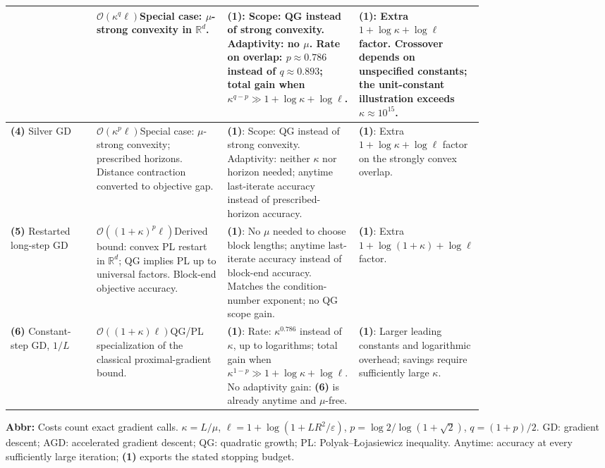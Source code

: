 \begin{table}[tp]
\begin{threeparttable}
\begin{tabularx}{\linewidth}{@{}>{\raggedright\arraybackslash}p{0.20\linewidth}>{\raggedright\arraybackslash}p{0.30\linewidth}>{\raggedright\arraybackslash}p{0.28\linewidth}>{\raggedright\arraybackslash}X@{}}
& $\mathcal{O}(\kappa^q\ell)$\newline Special case: $\mu$-strong convexity in $\mathbb R^d$.
& \textbf{(1)}: Scope: QG instead of strong convexity. Adaptivity: no $\mu$. Rate on overlap: $p\approx0.786$ instead of $q\approx0.893$; total gain when $\kappa^{q-p}\gg1+\log\kappa+\log\ell$.
& \textbf{(1)}: Extra $1+\log\kappa+\log\ell$ factor. Crossover depends on unspecified constants; the unit-constant illustration exceeds $\kappa\approx10^{15}$. \\
\midrule
\textbf{(4)} Silver GD \citep[Thm.~1.1]{scqgAltschulerParrilo2023}
& $\mathcal{O}(\kappa^p\ell)$\newline Special case: $\mu$-strong convexity; prescribed horizons. Distance contraction converted to objective gap.
& \textbf{(1)}: Scope: QG instead of strong convexity. Adaptivity: neither $\kappa$ nor horizon needed; anytime last-iterate accuracy instead of prescribed-horizon accuracy.
& \textbf{(1)}: Extra $1+\log\kappa+\log\ell$ factor on the strongly convex overlap. \\
\midrule
\textbf{(5)} Restarted long-step GD \citep[Remark~3]{scqgGrimmer2024}
& $\mathcal{O}((1+\kappa)^p\ell)$\newline Derived bound: convex PL restart in $\mathbb R^d$; QG implies PL up to universal factors. Block-end objective accuracy.
& \textbf{(1)}: No $\mu$ needed to choose block lengths; anytime last-iterate accuracy instead of block-end accuracy. Matches the condition-number exponent; no QG scope gain.
& \textbf{(1)}: Extra $1+\log(1+\kappa)+\log\ell$ factor. \\
\midrule
\textbf{(6)} Constant-step GD, $1/L$ \citep[Sec.~2.1]{scqgFercoqQu2017}
& $\mathcal{O}((1+\kappa)\ell)$\newline QG/PL specialization of the classical proximal-gradient bound.
& \textbf{(1)}: Rate: $\kappa^{0.786}$ instead of $\kappa$, up to logarithms; total gain when $\kappa^{1-p}\gg1+\log\kappa+\log\ell$. No adaptivity gain: \textbf{(6)} is already anytime and $\mu$-free.
& \textbf{(1)}: Larger leading constants and logarithmic overhead; savings require sufficiently large $\kappa$. \\
\bottomrule
\end{tabularx}
\begin{tablenotes}[flushleft]\footnotesize
\item[] \textbf{Abbr:} Costs count exact gradient calls. $\kappa=L/\mu$, $\ell=1+\log(1+LR^2/\varepsilon)$, $p=\log 2/\log(1+\sqrt2)$, $q=(1+p)/2$. GD: gradient descent; AGD: accelerated gradient descent; QG: quadratic growth; PL: Polyak--\L{}ojasiewicz inequality. Anytime: accuracy at every sufficiently large iteration; \textbf{(1)} exports the stated stopping budget.
\end{tablenotes}
\end{threeparttable}
\end{table}
